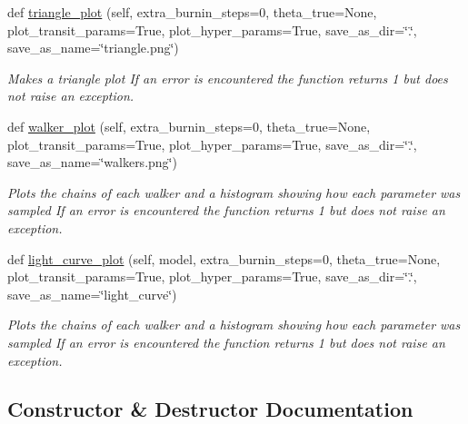 \begin{DoxyCompactItemize}
def \hyperlink{classexospec_1_1mcmc_1_1_m_c_m_c_af240e8deac4470da704239926ea56822}{triangle\+\_\+plot} (self, extra\+\_\+burnin\+\_\+steps=0, theta\+\_\+true=None, plot\+\_\+transit\+\_\+params=True, plot\+\_\+hyper\+\_\+params=True, save\+\_\+as\+\_\+dir=\char`\"{}.\char`\"{}, save\+\_\+as\+\_\+name=\char`\"{}triangle.\+png\char`\"{})
\begin{DoxyCompactList}\small\item\em Makes a triangle plot If an error is encountered the function returns 1 but does not raise an exception. \end{DoxyCompactList}\item 
def \hyperlink{classexospec_1_1mcmc_1_1_m_c_m_c_a741c2882baef53c1fa19b2c086ec8261}{walker\+\_\+plot} (self, extra\+\_\+burnin\+\_\+steps=0, theta\+\_\+true=None, plot\+\_\+transit\+\_\+params=True, plot\+\_\+hyper\+\_\+params=True, save\+\_\+as\+\_\+dir=\char`\"{}.\char`\"{}, save\+\_\+as\+\_\+name=\char`\"{}walkers.\+png\char`\"{})
\begin{DoxyCompactList}\small\item\em Plots the chains of each walker and a histogram showing how each parameter was sampled If an error is encountered the function returns 1 but does not raise an exception. \end{DoxyCompactList}\item 
def \hyperlink{classexospec_1_1mcmc_1_1_m_c_m_c_ab2c5cc870e2b384534404f3bc667e039}{light\+\_\+curve\+\_\+plot} (self, model, extra\+\_\+burnin\+\_\+steps=0, theta\+\_\+true=None, plot\+\_\+transit\+\_\+params=True, plot\+\_\+hyper\+\_\+params=True, save\+\_\+as\+\_\+dir=\char`\"{}.\char`\"{}, save\+\_\+as\+\_\+name=\char`\"{}light\+\_\+curve\char`\"{})
\begin{DoxyCompactList}\small\item\em Plots the chains of each walker and a histogram showing how each parameter was sampled If an error is encountered the function returns 1 but does not raise an exception. \end{DoxyCompactList}\end{DoxyCompactItemize}


\subsection{Constructor \& Destructor Documentation}
\mbox{\label{classexospec_1_1mcmc_1_1_m_c_m_c_aae17f42d9fa567e61df69f7c808aa931}} 
